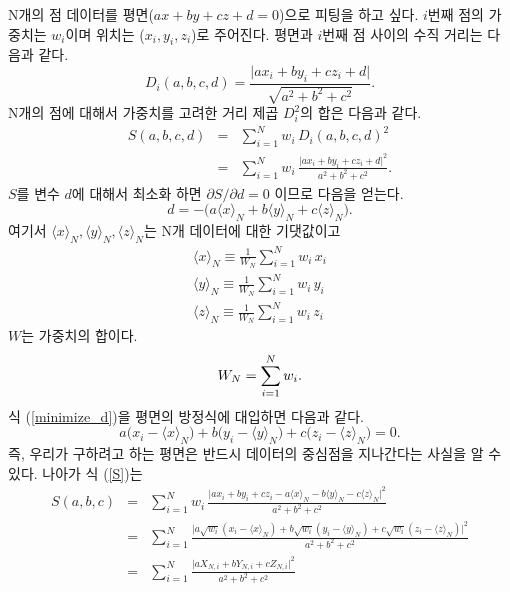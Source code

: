 \documentclass[chapter,a4paper,10pt]{oblivoir}
\begin{document}
N개의 점 데이터를 평면($ax+by+cz+d=0$)으로 피팅을 하고 싶다. $i$번째 점의 가중치는 $w_i$이며 위치는 ($x_i, y_i, z_i$)로 주어진다.
평면과 $i$번째 점 사이의 수직 거리는 다음과 같다.
\begin{equation}
D_i(a,b,c,d) = \frac{\vert ax_i + by_i + cz_i + d \vert}{\sqrt{a^2 + b^2 + c^2}}.
\end{equation}
N개의 점에 대해서 가중치를 고려한 거리 제곱 $D_i^2$의 합은 다음과 같다.
\begin{eqnarray} \label{S}
S(a,b,c,d) &=& \sum_{i=1}^N w_i\, D_i(a,b,c,d)^2 \\\nonumber
&=& \sum_{i=1}^N w_i\, \frac{\vert ax_i + by_i + cz_i + d \vert^2}{a^2 + b^2 + c^2}.
\end{eqnarray}
$S$를 변수 $d$에 대해서 최소화 하면 ${\partial S}/{\partial d} = 0$ 이므로 다음을 얻는다.
\begin{equation} \label{minimize_d}
d = -\Big(a\langle x \rangle_N + b\langle y \rangle_N + c\langle z \rangle_N\Big).
\end{equation}
여기서 $\langle x \rangle_N, \langle y \rangle_N, \langle z \rangle_N$는 N개 데이터에 대한 기댓값이고
\begin{eqnarray} \label{expectation_value}
\langle x \rangle_N \equiv \frac{1}{W_N}\sum_{i=1}^N w_i\,x_i\\
\langle y \rangle_N \equiv \frac{1}{W_N}\sum_{i=1}^N w_i\,y_i\\
\langle z \rangle_N \equiv \frac{1}{W_N}\sum_{i=1}^N w_i\,z_i
\end{eqnarray}
$W$는 가중치의 합이다.
\begin{equation} \label{W}
W_N = \sum_{i=1}^N w_i. \\
\end{equation}
식 (\ref{minimize_d})을 평면의 방정식에 대입하면 다음과 같다.
\begin{equation}
a\big(x_i-\langle x \rangle_N\big) + b\big(y_i-\langle y \rangle_N\big) + c\big(z_i-\langle z \rangle_N\big) = 0.
\end{equation}
즉, 우리가 구하려고 하는 평면은 반드시 데이터의 중심점을 지나간다는 사실을 알 수 있다.
나아가 식 (\ref{S})는
\begin{eqnarray} \label{S2}
S(a,b,c) 
&=& \sum_{i=1}^N w_i\, \frac{\vert ax_i + by_i + cz_i - a\langle x \rangle_N - b\langle y \rangle_N - c\langle z \rangle_N \vert^2}{a^2 + b^2 + c^2} \\
&=& \sum_{i=1}^N \frac{\vert a \sqrt{w_i}(x_i-\langle x \rangle_N) + b \sqrt{w_i}(y_i-\langle y \rangle_N) + c \sqrt{w_i}(z_i-\langle z \rangle_N) \vert^2}{a^2 + b^2 + c^2} \nonumber\\
&=& \sum_{i=1}^N \frac{\vert aX_{N,i} + bY_{N,i} + cZ_{N,i} \vert^2}{a^2 + b^2 + c^2} \nonumber
\end{eqnarray}
\end{document}
